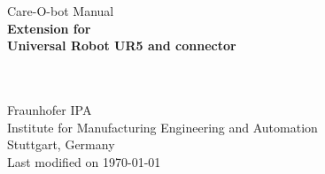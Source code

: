 \documentclass[12pt,twoside]{report}
\begin{document}
\begin{titlepage}
\vspace*{13mm}
\begin{center}
  \vspace{10mm} 
         {\large \hspace{20mm} Care-O-bot Manual\\}
  \vspace{10mm}
       {\Large
          \bf
          \hspace{20mm} Extension for\\} 
  \vspace{5mm}
       {\Large
          \bf
          \hspace{20mm} Universal Robot UR5 and connector\\}

  \vspace{80mm}
  \makebox[40mm]{}\\
  \makebox[40mm]{}\\
  \vspace{10mm}
         {\large \hspace{20mm} Fraunhofer IPA} \\
  \vspace{5mm}
         {\large \hspace{20mm} Institute for Manufacturing Engineering and Automation} \\
         {\large \hspace{20mm} Stuttgart, Germany} \\
  \vfill
         {\large \hspace{20mm} Last modified on \today}
\end{center}
\end{titlepage}

\clearpage
\thispagestyle{empty}
\cleardoublepage
\thispagestyle{empty}\cleardoublepage %
\evensidemargin=2pt
\oddsidemargin=40pt
\renewcommand{\baselinestretch}{1.15}\normalsize
{}
\end{document}
